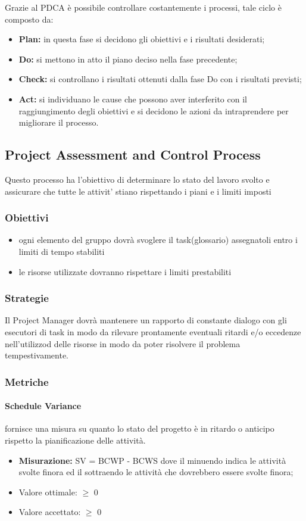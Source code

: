 	Grazie al PDCA è possibile controllare costantemente i processi, tale ciclo è composto da:
	\begin{itemize}
		\item \textbf{Plan:} in questa fase si decidono gli obiettivi e i risultati desiderati;
		\item \textbf{Do:} si mettono in atto il piano deciso nella fase precedente;	
		\item \textbf{Check:} si controllano i risultati ottenuti dalla fase Do con i risultati previsti;
		\item \textbf{Act:} si individuano le cause che possono aver interferito con il raggiungimento degli obiettivi e si decidono le azioni da intraprendere per migliorare il processo.
	\end{itemize}

	\subsection{Project Assessment and Control Process}
		Questo processo ha l'obiettivo di determinare lo stato del lavoro svolto e assicurare che tutte le attivit' stiano rispettando i piani e i limiti  imposti	\subsubsection{Obiettivi}
			\begin{itemize}
				\item ogni elemento del gruppo dovrà svoglere il task(glossario) assegnatoli entro i limiti di tempo stabiliti
				\item  le risorse utilizzate dovranno rispettare i limiti prestabiliti
			\end{itemize}
	\subsubsection{Strategie}
	Il Project Manager dovrà mantenere un rapporto di constante dialogo con gli esecutori di task in modo da rilevare prontamente eventuali ritardi  e/o eccedenze nell'utilizzod delle risorse in modo da poter risolvere il problema tempestivamente.
	\subsubsection{Metriche}
		\paragraph{Schedule Variance}
		fornisce una misura su quanto lo stato del progetto è in ritardo o anticipo rispetto la pianificazione delle attività.
		\begin{itemize}
			\item  \textbf{Misurazione: } SV =  BCWP - BCWS dove il minuendo indica le attività svolte finora ed il sottraendo le attività che dovrebbero essere svolte finora;
			\item Valore ottimale: $\geq$ 0
			\item Valore accettato: $\geq$ 0
		\end{itemize}
